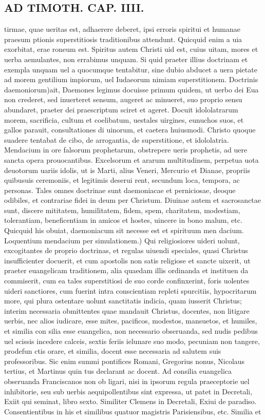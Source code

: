 \documentclass{article}
\begin{document}
\begin{pages}
\section*{AD TIMOTH. CAP. IIII. }
\marginpar{[ p.505 ]}\pstart tirmae, quae ueritas est, adhaerere deberet, ipsi erroris spiritui et humanae praesum ptionis superstitiosis traditionibus attendunt. Quicquid enim a uia exorbitat, erae roneum est. Spiritus autem Christi uid est, cuius uitam, mores et uerba aemulantes, non errabimus unquam. Si quid praeter illius doctrinam et exempla unquam uel a quocumque tentabitur, sine dubio abducet a uera pietate ad morem gentilium impiorum, uel Iudaeorum nimiam superstitionem. Doctrinis daemoniorum)ait, Daemones legimus docuisse primum quidem, ut uerbo dei Eua non crederet, sed inuerteret sensum, augeret ac minueret, suo proprio sensu abundaret, praeter dei praescriptum sciret et ageret. Docuit idololatrarum morem, sacrificia, cultum et coelibatum, uestales uirgines, eunuchos suos, et gallos parauit, consultationes di uinorum, et caetera huiusmodi. Christo quoque suadere tentabat de cibo, de arrogantia, de superstitione, et idololatria. Mendacium in ore falsorum prophetarum, obstrepere ueris prophetis, ad uere sancta opera prouocantibus. Excelsorum et ararum multitudinem, perpetua uota deuotorum uariis idolis, ut is Marti, alius Veneri, Mercurio et Dianae, propriis quibusuis ceremoniis, et legitimis deserui rent, secundum loca, tempora, ac personas. Tales omnes doctrinae sunt daemoniacae et perniciosae, deoque odibiles, et contrariae fidei in deum per Christum. Diuinae autem et sacrosanctae sunt, discere mititatem, humilitatem, fidem, spem, charitatem, modestiam, tolerantiam, beneficentiam in amicos et hostes, uincere in bono malum, etc. Quicquid his obuiat, daemoniacum sit necesse est et spirituum men dacium. Loquentium mendacium per simulationem.) Qui religiosiores uideri uolunt, excogitantes de proprio doctrinas, et regulas uiuendi speciales, quasi Christus insufficienter docuerit, et cum apostolis non satis religiose et sancte uixerit, ut praeter euangelicam traditionem, alia quaedam illis ordinanda et instituen da commiserit, cum ea tales superstitiosi de suo corde confinxerint, foris uolentes uideri sanctiores, cum fuerint intra conscientiam repleti spurcitiis, hypocritarum more, qui plura ostentare uolunt sanctitatis indicia, quam iusserit Christus; interim necessaria obmittentes quae mandauit Christus, docentes, non litigare uerbis, nec alios iudicare, esse mites, pacificos, modestos, mansuetos, et humiles, et similia con silia esse euangelica, non necessario obseruanda, sed nudis pedibus uel scissis incedere calceis, sextis feriis ielunare suo modo, pecuniam non tangere, prodefun ctis orare, et similia, docent esse necessaria ad salutem suis professoribus. Sic enim summi pontifices Romani, Gregorius nonus, Nicolaus tertius, et Martinus quin tus declarant ac docent. Ad consilia euangelica obseruanda Franciscanos non ob ligari, nisi in ipsorum regula praeceptorie uel inhibitorie, seu sub uerbis aequipollentibus sint expressa, ut patet in Decretali, Exiit qui seminat, libro sexto. Similiter Clemens in Decretali, Exiui de paradiso. Consentientibus in his et similibus quatuor magistris Parisiensibus, etc. Similia et 
\end{pages}
\end{document}
